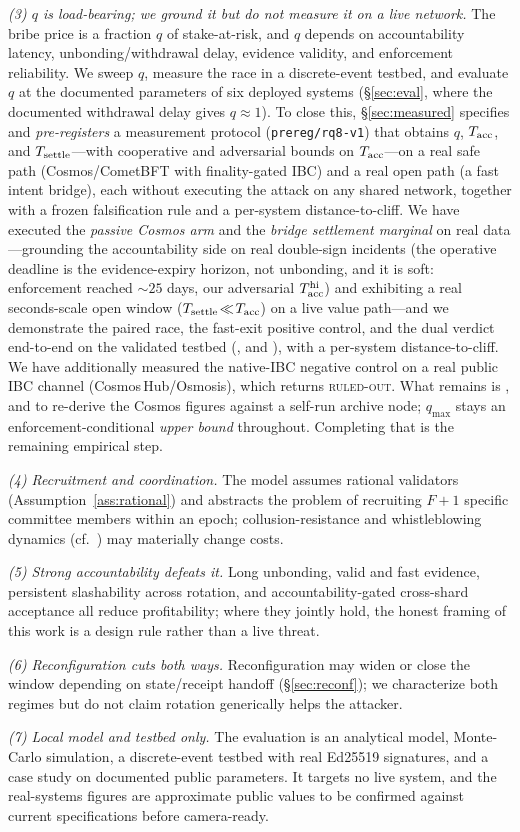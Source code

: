 \emph{(3) $q$ is load-bearing; we ground it but do not measure it on a live network.} The bribe price
is a fraction $q$ of stake-at-risk, and $q$ depends on accountability latency, unbonding/withdrawal
delay, evidence validity, and enforcement reliability. We sweep $q$, measure the race in a
discrete-event testbed, and evaluate $q$ at the documented parameters of six deployed systems
(\S\ref{sec:eval}, where the documented withdrawal delay gives $q\approx1$). To close this, \S\ref{sec:measured}
specifies and \emph{pre-registers} a measurement protocol (\texttt{prereg/rq8-v1}) that obtains
$q$, $T_{\mathrm{acc}}$, and $T_{\mathrm{settle}}$---with cooperative and adversarial bounds on $T_{\mathrm{acc}}$---on a real safe
path (Cosmos/CometBFT with finality-gated IBC) and a real open path (a fast intent bridge), each
without executing the attack on any shared network, together with a frozen falsification rule and a
per-system distance-to-cliff. We have executed the \emph{passive Cosmos arm} and the \emph{bridge
settlement marginal} on real data---grounding the accountability side on real double-sign incidents
(the operative deadline is the evidence-expiry horizon, not unbonding, and it is soft: enforcement
reached ${\sim}25$ days, our adversarial $T_{\mathrm{acc}}^{\mathrm{hi}}$) and exhibiting a real seconds-scale
open window ($T_{\mathrm{settle}}\!\ll\!T_{\mathrm{acc}}$) on a live value path---and we demonstrate the paired race, the
fast-exit positive control, and the dual verdict end-to-end on the validated testbed
(\ArtifactPairedMode, and \ArtifactPosCtrlMode), with a per-system distance-to-cliff. We have
additionally measured the native-IBC negative control on a real public IBC channel
(Cosmos\,Hub/Osmosis), which returns \textsc{ruled-out}. What remains is \ArtifactRqEightRemains, and to
re-derive the Cosmos figures against a self-run archive node; $q_{\max}$ stays an enforcement-conditional
\emph{upper bound} throughout. Completing that is the remaining empirical step.

\emph{(4) Recruitment and coordination.} The model assumes rational validators
(Assumption~\ref{ass:rational}) and abstracts the problem of recruiting $F{+}1$ specific committee
members within an epoch; collusion-resistance and whistleblowing dynamics
(cf.~\cite{kelkar2025omerta}) may materially change costs.

\emph{(5) Strong accountability defeats it.} Long unbonding, valid and fast evidence, persistent
slashability across rotation, and accountability-gated cross-shard acceptance all reduce profitability;
where they jointly hold, the honest framing of this work is a design rule rather than a live threat.

\emph{(6) Reconfiguration cuts both ways.} Reconfiguration may widen or close the window depending on
state/receipt handoff (\S\ref{sec:reconf}); we characterize both regimes but do not claim rotation
generically helps the attacker.

\emph{(7) Local model and testbed only.} The evaluation is an analytical model, Monte-Carlo
simulation, a discrete-event testbed with real Ed25519 signatures, and a case study on documented
public parameters. It targets no live system, and the real-systems figures are approximate public
values to be confirmed against current specifications before camera-ready.
